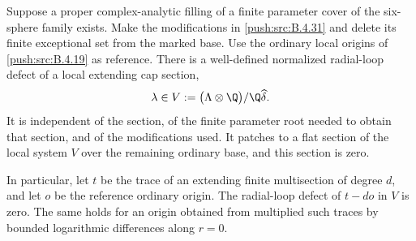 \begin{proposition}\hypertarget{tag-0312}{}\label{push:src:B.4.32}
\label{push:B432}

Suppose a proper complex-analytic filling of a finite parameter
cover of the six-sphere family exists. Make the
modifications in \ref{push:src:B.4.31} and delete its finite exceptional set
from the marked base. Use the ordinary local origins of
\ref{push:src:B.4.19} as reference. There is a well-defined normalized
radial-loop defect of a local extending cap section,
\begin{equation}
 \lambda\in
 V:=\bigl(\Lambda\otimes\Q\bigr)/\Q\widehat\delta .
\label{pub:I:eq:B-4-32-1}
\end{equation}
It is independent of the section, of the finite parameter root
needed to obtain that section, and of the modifications used.
It patches to a flat section of the local system $V$
over the remaining ordinary base, and this section is zero.

In particular, let $t$ be the trace of an extending finite
multisection of degree $d$, and let $o$ be the reference ordinary
origin. The radial-loop defect of $t-do$ in $V$ is zero.
The same holds for an origin obtained from multiplied such
traces by bounded logarithmic differences along $r=0$.

\end{proposition}



